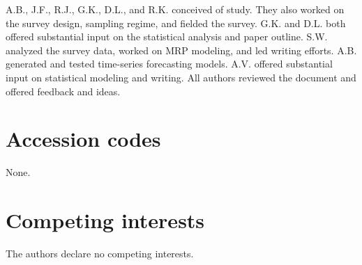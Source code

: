 \documentclass[fleqn,10pt]{wlscirep}
\begin{document}
A.B., J.F., R.J., G.K., D.L., and R.K. conceived of study. They also worked on the survey design, sampling regime, and fielded the survey. G.K. and D.L. both offered substantial input on the statistical analysis and paper outline. S.W. analyzed the survey data, worked on MRP modeling, and led writing efforts. A.B. generated and tested time-series forecasting models. A.V. offered substantial input on statistical modeling and writing. All authors reviewed the document and offered feedback and ideas. 

\section*{Accession codes}
None.

\section*{Competing interests}

The authors declare no competing interests. 
\end{document}
